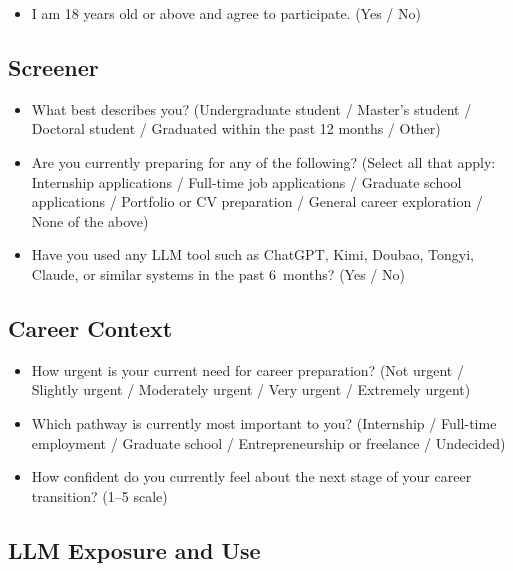 \documentclass[sigconf,review,anonymous]{acmart}
\begin{document}
\begin{itemize}
  \item[\textbf{Consent}] I am 18 years old or above and agree to
    participate. (Yes / No)
\end{itemize}

\subsection*{Screener}

\begin{itemize}
  \item[\textbf{S1.}] What best describes you? (Undergraduate student /
    Master's student / Doctoral student / Graduated within the past 12
    months / Other)
  \item[\textbf{S2.}] Are you currently preparing for any of the following?
    (Select all that apply: Internship applications / Full-time job
    applications / Graduate school applications / Portfolio or CV
    preparation / General career exploration / None of the above)
  \item[\textbf{S3.}] Have you used any LLM tool such as ChatGPT, Kimi,
    Doubao, Tongyi, Claude, or similar systems in the past 6~months?
    (Yes / No)
\end{itemize}

\subsection*{Career Context}

\begin{itemize}
  \item[\textbf{C1.}] How urgent is your current need for career
    preparation? (Not urgent / Slightly urgent / Moderately urgent / Very
    urgent / Extremely urgent)
  \item[\textbf{C2.}] Which pathway is currently most important to you?
    (Internship / Full-time employment / Graduate school / Entrepreneurship
    or freelance / Undecided)
  \item[\textbf{C3.}] How confident do you currently feel about the next
    stage of your career transition? (1--5 scale)
\end{itemize}

\subsection*{LLM Exposure and Use}
\end{document}
